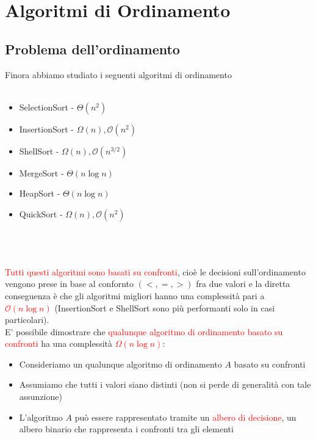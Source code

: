 \documentclass[../cheatSheetAlgoritmi.tex]{subfiles}
\begin{document}
\section{Algoritmi di Ordinamento}
\subsection{Problema dell'ordinamento}
Finora abbiamo studiato i seguenti algoritmi di ordinamento\\\\
\noindent\begin{minipage}{0.5\textwidth}
\begin{itemize}
	\item SelectionSort - $\Theta(n^{2})$
	\item InsertionSort - $\Omega(n), \mathcal{O}(n^{2})$
	\item ShellSort - $\Omega(n), \mathcal{O}(n^{3/2})$
\end{itemize}
\end{minipage}
\hfill
\begin{minipage}{0.5\textwidth}\raggedleft
\begin{itemize}
	\item MergeSort - $\Theta(n \log n)$
	\item HeapSort - $\Theta(n \log n)$
	\item QuickSort - $\Omega(n), \mathcal{O}(n^{2})$
\end{itemize}
\end{minipage} \\\\\\
\textcolor{red}{Tutti questi algoritmi sono basati su confronti}, cioè le decisioni sull'ordinamento vengono prese in base al confornto $(<, =, >)$ fra due valori e la diretta conseguenza è che gli algoritmi migliori hanno una complessità pari a \textcolor{red}{$\mathcal{O}(n \log n)$} (InsertionSort e ShellSort sono più performanti solo in casi particolari).\\
E' possibile dimostrare che \textcolor{red}{qualunque algoritmo di ordinamento basato su confronti} ha una complessità \textcolor{red}{$\Omega(n \log n)$}:
\begin{itemize}
	\item Consideriamo un qualunque algoritmo di ordinamento $A$ basato su confronti
	\item Assumiamo che tutti i valori siano distinti (non si perde di generalità con tale assunzione)
	\item L'algoritmo $A$ può essere rappresentato tramite un \textcolor{red}{albero di decisione}, un albero binario che rappresenta i confronti tra gli elementi
\end{itemize}
\end{document}
